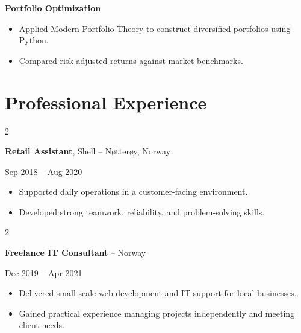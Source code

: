 \documentclass[10pt, letterpaper]{article}
\newenvironment{highlights}{
    \begin{itemize}[
        topsep=0.1 cm, parsep=0.1 cm, partopsep=0pt,
        itemsep=0.05 cm, %
        leftmargin=0 cm
    ]
}{
    \end{itemize}
}
\newenvironment{onecolentry}{\par\addvspace{0.1cm}}{\par\addvspace{0.1cm}}
\newenvironment{twocolentry}[2][]{
    \def\secondColumn{#2}
    \setcolumnwidth{\fill, 4.5 cm}
    \begin{paracol}{2}
}{
    \switchcolumn \raggedleft \secondColumn
    \end{paracol}
}
\begin{document}
\vspace{0.2 cm}

\begin{onecolentry}
    \textbf{Portfolio Optimization}
\end{onecolentry}
\begin{onecolentry}
    \begin{highlights}
    \setlength\itemindent{2em}
        \item Applied Modern Portfolio Theory to construct diversified portfolios using Python.
        \item Compared risk-adjusted returns against market benchmarks.
    \end{highlights}
\end{onecolentry}

\section{Professional Experience}
\begin{twocolentry}{Sep 2018 -- Aug 2020}
    \textbf{Retail Assistant}, Shell -- Nøtterøy, Norway
\end{twocolentry}
\begin{onecolentry}
    \begin{highlights}
    \setlength\itemindent{2em}
        \item Supported daily operations in a customer-facing environment. 
        \item Developed strong teamwork, reliability, and problem-solving skills. 
    \end{highlights}
\end{onecolentry}

\vspace{0.2 cm}

\begin{twocolentry}{Dec 2019 -- Apr 2021}
    \textbf{Freelance IT Consultant} -- Norway
\end{twocolentry}
\begin{onecolentry}
    \begin{highlights}
    \setlength\itemindent{2em}
        \item Delivered small-scale web development and IT support for local businesses. 
        \item Gained practical experience managing projects independently and meeting client needs. 
    \end{highlights}
\end{onecolentry}
\end{document}
